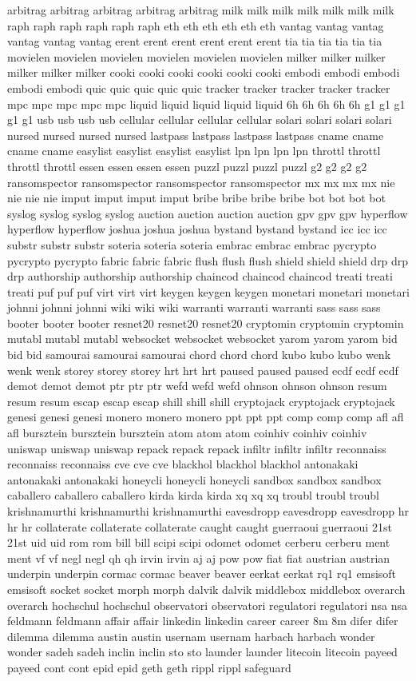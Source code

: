 \documentclass[conference]{IEEEtran}
\begin{document}
arbitrag arbitrag arbitrag arbitrag arbitrag milk milk milk milk milk milk milk raph raph raph raph raph raph eth eth eth eth eth eth vantag vantag vantag vantag vantag vantag erent erent erent erent erent erent tia tia tia tia tia tia movielen movielen movielen movielen movielen movielen milker milker milker milker milker milker cooki cooki cooki cooki cooki cooki embodi embodi embodi embodi embodi quic quic quic quic quic tracker tracker tracker tracker tracker mpc mpc mpc mpc mpc liquid liquid liquid liquid liquid 6h 6h 6h 6h 6h g1 g1 g1 g1 g1 usb usb usb usb cellular cellular cellular cellular solari solari solari solari nursed nursed nursed nursed lastpass lastpass lastpass lastpass cname cname cname cname easylist easylist easylist easylist lpn lpn lpn lpn throttl throttl throttl throttl essen essen essen essen puzzl puzzl puzzl puzzl g2 g2 g2 g2 ransomspector ransomspector ransomspector ransomspector mx mx mx mx nie nie nie nie imput imput imput imput bribe bribe bribe bribe bot bot bot bot syslog syslog syslog syslog auction auction auction auction gpv gpv gpv hyperflow hyperflow hyperflow joshua joshua joshua bystand bystand bystand icc icc icc substr substr substr soteria soteria soteria embrac embrac embrac pycrypto pycrypto pycrypto fabric fabric fabric flush flush flush shield shield shield drp drp drp authorship authorship authorship chaincod chaincod chaincod treati treati treati puf puf puf virt virt virt keygen keygen keygen monetari monetari monetari johnni johnni johnni wiki wiki wiki warranti warranti warranti sass sass sass booter booter booter resnet20 resnet20 resnet20 cryptomin cryptomin cryptomin mutabl mutabl mutabl websocket websocket websocket yarom yarom yarom bid bid bid samourai samourai samourai chord chord chord kubo kubo kubo wenk wenk wenk storey storey storey hrt hrt hrt paused paused paused ecdf ecdf ecdf demot demot demot ptr ptr ptr wefd wefd wefd ohnson ohnson ohnson resum resum resum escap escap escap shill shill shill cryptojack cryptojack cryptojack genesi genesi genesi monero monero monero ppt ppt ppt comp comp comp afl afl afl bursztein bursztein bursztein atom atom atom coinhiv coinhiv coinhiv uniswap uniswap uniswap repack repack repack infiltr infiltr infiltr reconnaiss reconnaiss reconnaiss cve cve cve blackhol blackhol blackhol antonakaki antonakaki antonakaki honeycli honeycli honeycli sandbox sandbox sandbox caballero caballero caballero kirda kirda kirda xq xq xq troubl troubl troubl krishnamurthi krishnamurthi krishnamurthi eavesdropp eavesdropp eavesdropp hr hr hr collaterate collaterate collaterate caught caught guerraoui guerraoui 21st 21st uid uid rom rom bill bill scipi scipi odomet odomet cerberu cerberu ment ment vf vf negl negl qh qh irvin irvin aj aj pow pow fiat fiat austrian austrian underpin underpin cormac cormac beaver beaver eerkat eerkat rq1 rq1 emsisoft emsisoft socket socket morph morph dalvik dalvik middlebox middlebox overarch overarch hochschul hochschul observatori observatori regulatori regulatori nsa nsa feldmann feldmann affair affair linkedin linkedin career career 8m 8m difer difer dilemma dilemma austin austin usernam usernam harbach harbach wonder wonder sadeh sadeh inclin inclin sto sto launder launder litecoin litecoin payeed payeed cont cont epid epid geth geth rippl rippl safeguard 
\end{document}
